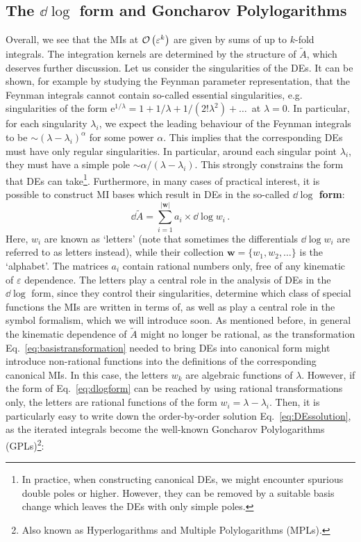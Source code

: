 \documentclass[main.tex]{subfiles}
\begin{document}
\subsection{The $\dd \log$ form and Goncharov Polylogarithms} \label{sec:DEdlogform}
Overall, we see that the MIs at $\mathcal{O}\left(\varepsilon^k\right)$ are given by sums of up to $k$-fold integrals. The integration kernels are determined by the structure of $\tilde{A}$, which deserves further discussion. Let us consider the singularities of the DEs. It can be shown, for example by studying the Feynman parameter representation, that the Feynman integrals cannot contain so-called essential singularities, e.g. singularities of the form $\mathrm{e}^{1/\lambda} = 1+ 1/\lambda + 1/(2!\lambda^2)+\ldots\,$ at $\lambda=0$. In particular, for each singularity $\lambda_i$, we expect the leading behaviour of the Feynman integrals to be $\sim (\lambda- \lambda_i)^\alpha$ for some power $\alpha$. This implies that the corresponding DEs must have only regular singularities. In particular, around each singular point $\lambda_i$, they must have a simple pole $\sim \alpha/(\lambda-\lambda_i)$. This strongly constrains the form that DEs can take\footnote{In practice, when constructing canonical DEs, we might encounter spurious double poles or higher. However, they can be removed by a suitable basis change which leaves the DEs with only simple poles. }\cite{Henn:2014qga}. Furthermore, in many cases of practical interest, it is possible to construct MI bases which result in DEs in the so-called \textbf{$\dd \log$ form}:
\begin{equation} \label{eq:dlogform}
    \dd\tilde{A} = \sum_{i=1}^{|\bm{w}|} a_i \times \dd \log w_i\,.
\end{equation}
Here, $w_i$ are known as `letters' (note that sometimes the differentials $\dd \log w_i$ are referred to as letters instead), while their collection $\bm{w} = \{w_1, w_2, \ldots\}$ is the `alphabet'. The matrices $a_i$ contain rational numbers only, free of any kinematic of $\varepsilon$ dependence. The letters play a central role in the analysis of DEs in the $\dd \log$ form, since they control their singularities, determine which class of special functions the MIs are written in terms of, as well as play a central role in the symbol formalism, which we will introduce soon. As mentioned before, in general the kinematic dependence of $\tilde{A}$ might no longer be rational, as the transformation Eq.~\ref{eq:basistransformation} needed to bring DEs into canonical form might introduce non-rational functions into the definitions of the corresponding canonical MIs. In this case, the letters $w_k$ are algebraic functions of $\lambda$. However, if the form of Eq.~\ref{eq:dlogform} can be reached by using rational transformations only, the letters are rational functions of the form $w_i = \lambda - \lambda_i$. Then, it is particularly easy to write down the order-by-order solution Eq.~\ref{eq:DEssolution}, as the iterated integrals become the well-known Goncharov Polylogarithms (GPLs)\footnote{Also known as Hyperlogarithms and Multiple Polylogarithms (MPLs).}\cite{2001math......3059G, 2011arXiv1105.2076G, Vollinga:2004sn}:
\end{document}
